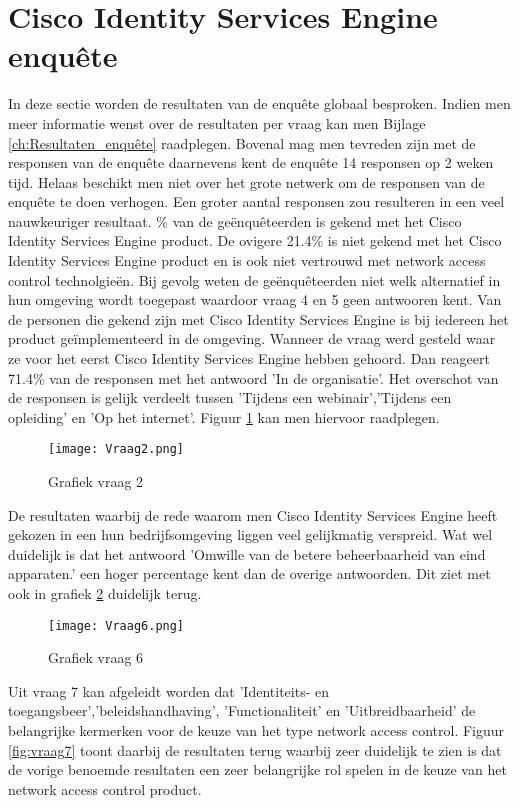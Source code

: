 \section{Cisco Identity Services Engine enquête}
\label{sec:enqueteISe}
In deze sectie worden de resultaten van de enquête globaal besproken. Indien men meer informatie wenst over de resultaten per vraag kan men Bijlage \ref{ch:Resultaten_enquête} raadplegen.
\newline
\newline
Bovenal mag men tevreden zijn met de responsen van de enquête daarnevens kent de enquête 14 responsen op 2 weken tijd. Helaas beschikt men niet over het grote netwerk om de responsen van de enquête te doen verhogen. Een groter aantal responsen zou resulteren in een veel nauwkeuriger resultaat.  
\newline
{}\% van de geënquêteerden is gekend met het Cisco Identity Services Engine product. De ovigere 21.4\% is niet gekend met het Cisco Identity Services Engine product en is ook niet vertrouwd met network access control technolgieën. Bij gevolg weten de geënquêteerden niet welk alternatief in hun omgeving wordt toegepast waardoor vraag 4 en 5 geen antwooren kent. Van de personen die gekend zijn met Cisco Identity Services Engine is bij iedereen het product geïmplementeerd in de omgeving. Wanneer de vraag werd gesteld waar ze voor het eerst Cisco Identity Services Engine hebben gehoord. Dan reageert 71.4\% van de responsen met het antwoord 'In de organisatie'. Het overschot van de responsen is gelijk verdeelt tussen 'Tijdens een webinair','Tijdens een opleiding' en 'Op het internet'. Figuur \ref{fig:vraag2} kan men hiervoor raadplegen. 
\begin{figure}[H]
	\centering
	\texttt{[image: Vraag2.png]}
	\caption{Grafiek vraag 2}
	\label{fig:vraag2}
\end{figure}
De resultaten waarbij de rede waarom men Cisco Identity Services Engine heeft gekozen in een hun bedrijfsomgeving liggen veel gelijkmatig verspreid. Wat wel duidelijk is dat het antwoord 'Omwille van de betere beheerbaarheid van eind apparaten.' een hoger percentage kent dan de overige antwoorden. Dit ziet met ook in grafiek \ref{fig:graf6} duidelijk terug.
\begin{figure}[H]
	\centering
	\texttt{[image: Vraag6.png]}
	\caption{Grafiek vraag 6}
	\label{fig:graf6}
\end{figure}
Uit vraag 7 kan afgeleidt worden dat 'Identiteits- en toegangsbeer','beleidshandhaving', 'Functionaliteit' en 'Uitbreidbaarheid' de belangrijke kermerken voor de keuze van het type network access control. Figuur \ref{fig:vraag7} toont daarbij de resultaten terug waarbij zeer duidelijk te zien is dat de vorige benoemde resultaten een zeer belangrijke rol spelen in de keuze van het network access control product. 

